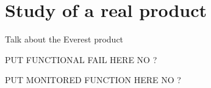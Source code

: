 \section{Study of a real product}
\label{sec:study-real-product}

Talk about the Everest product

PUT FUNCTIONAL FAIL HERE NO ?

PUT MONITORED FUNCTION HERE NO ?
